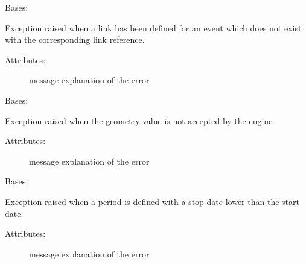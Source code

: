 \begin{fulllineitems}
\label{\detokenize{eboa.engine:eboa.engine.errors.UndefinedEventLink}}
Bases: {\hyperref[\detokenize{eboa.engine:eboa.engine.errors.Error}]{}}

Exception raised when a link has been defined for an event which does not exist with the corresponding link reference.
\begin{description}
\item[{Attributes:}] \leavevmode
message \textendash{} explanation of the error

\end{description}

\end{fulllineitems}


\begin{fulllineitems}
\label{\detokenize{eboa.engine:eboa.engine.errors.WrongGeometry}}
Bases: {\hyperref[\detokenize{eboa.engine:eboa.engine.errors.Error}]{}}

Exception raised when the geometry value is not accepted by the engine
\begin{description}
\item[{Attributes:}] \leavevmode
message \textendash{} explanation of the error

\end{description}

\end{fulllineitems}


\begin{fulllineitems}
\label{\detokenize{eboa.engine:eboa.engine.errors.WrongPeriod}}
Bases: {\hyperref[\detokenize{eboa.engine:eboa.engine.errors.Error}]{}}

Exception raised when a period is defined with a stop date lower than the start date.
\begin{description}
\item[{Attributes:}] \leavevmode
message \textendash{} explanation of the error

\end{description}

\end{fulllineitems}

